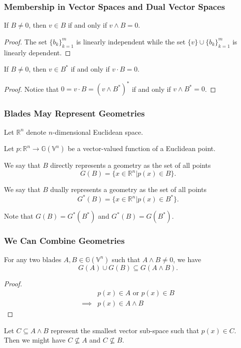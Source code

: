 \documentclass{beamer}
\newcommand{\G}{\mathbb{G}}
\newcommand{\V}{\mathbb{V}}
\newcommand{\R}{\mathbb{R}}
\begin{document}
\begin{frame}
\frametitle{Membership in Vector Spaces and Dual Vector Spaces}
If $B\neq 0$, then $v\in B$ if and only if $v\wedge B=0$.\pause
\begin{proof}
The set $\{b_k\}_{k=1}^m$ is linearly independent while the set $\{v\}\cup\{b_k\}_{k=1}^m$ is linearly dependent.
\end{proof}\pause
If $B\neq 0$, then $v\in B^*$ if and only if $v\cdot B=0$.\pause
\begin{proof}
Notice that $0=v\cdot B=(v\wedge B^*)^*$ if and only if $v\wedge B^*=0$.
\end{proof}
\end{frame}

\begin{frame}
\frametitle{Blades May Represent Geometries}
Let $\R^n$ denote $n$-dimensional Euclidean space.\pause

Let $p:\R^n\to\G(\V^n)$ be a vector-valued function of a Euclidean point.\pause
\begin{definition}
We say that $B$ \alert{directly} represents a geometry as the
set of all points
\begin{equation*}
G(B) = \{x\in\R^n|p(x)\in B\}.
\end{equation*}
\end{definition}\pause
\begin{definition}
We say that $B$ \alert{dually} represents a geometry as the
set of all points
\begin{equation*}
G^*(B) = \{x\in\R^n|p(x)\in B^*\}.
\end{equation*}
\end{definition}\pause
Note that $G(B)=G^*(B^*)$ and $G^*(B)=G(B^*)$.
\end{frame}

\begin{frame}
\frametitle{We Can Combine Geometries}
For any two blades $A,B\in\G(\V^n)$ such that $A\wedge B\neq 0$, we have
\begin{equation*}
G(A)\cup G(B)\subseteq G(A\wedge B).
\end{equation*}\pause
\begin{proof}
\begin{align*}
 & \mbox{$p(x)\in A$ or $p(x)\in B$} \\
\implies & \mbox{$p(x)\in A\wedge B$}
\end{align*}
\end{proof}\pause
Let $C\subseteq A\wedge B$ represent the smallest vector sub-space such that $p(x)\in C$.
Then we might have $C\not\subseteq A$ and $C\not\subseteq B$.
\end{frame}
\end{document}
